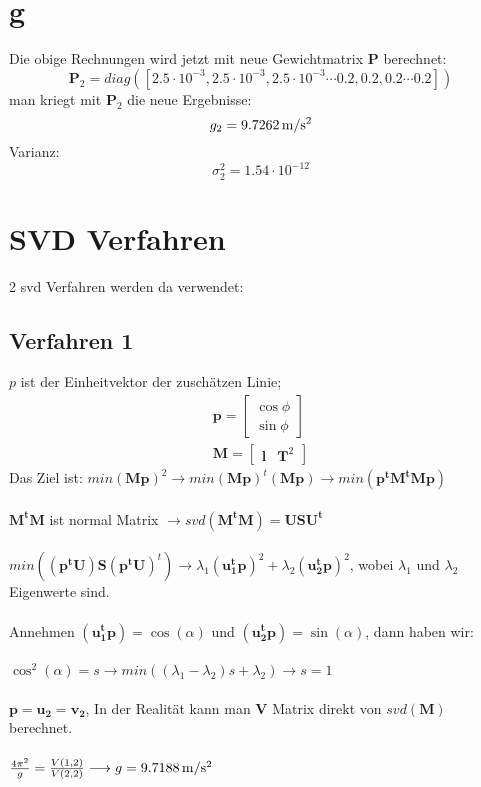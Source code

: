 \section{g}
Die obige Rechnungen wird jetzt mit neue Gewichtmatrix $\bm{P}$ berechnet:
\begin{equation*}
	\bm{P}_2 = diag([2.5\cdot10^{-3},2.5\cdot10^{-3},2.5\cdot10^{-3} \cdots 0.2, 0.2, 0.2\cdots 0.2])
\end{equation*}
man kriegt mit $\bm{P}_2$ die neue Ergebnisse:
\begin{equation*}
	g_2 = 9.7262 \,\mathrm{m/s^2}
\end{equation*}
Varianz:
\begin{equation*}
	\sigma^2_2 = 1.54 \cdot 10^{-12}
\end{equation*}
\section{SVD Verfahren}
2 svd Verfahren werden da verwendet:
\subsection{Verfahren 1}
$p$ ist der Einheitvektor der zuschätzen Linie;
\begin{gather}
	\bm{p} = \begin{bmatrix}
		\cos \phi \\
		\sin \phi
	\end{bmatrix}\\
	\bm{M} = \begin{bmatrix}
	\bm{l} &	\bm{T}^2 
	\end{bmatrix}
\end{gather}
Das Ziel ist: $min (\bm{Mp})^2 \rightarrow min(\bm{Mp})^t(\bm{Mp}) \rightarrow min(\bm{p^tM^tMp})$
\\\\
$\bm{M^tM}$ ist normal Matrix $\rightarrow svd(\bm{M^tM}) = \bm{U S U^t}$
\\\\
$min((\bm{p^tU}) \bm{S} (\bm{p^tU})^t) \rightarrow \lambda_1 (\bm{u_1^t p})^2 + \lambda_2 (\bm{u_2^t p})^2$, wobei $\lambda_1$ und $\lambda_2$ Eigenwerte sind. 
\\\\
Annehmen
$(\bm{u_1^t p}) = \cos(\alpha)$ und $(\bm{u_2^t p}) = \sin(\alpha)$, dann haben wir:
\\\\
$\cos^2(\alpha) = s \rightarrow min((\lambda_1 - \lambda_2)s + \lambda_2) \rightarrow s = 1$
\\\\
$\bm{p} = \bm{u_2} = \bm{v_2}$, In der Realität kann man $\bm{V}$ Matrix direkt von $svd(\bm{M})$ berechnet.\\\\ $\frac{4 \pi^2}{g} = \frac{V(1,2)}{V(2,2)} \longrightarrow g = 9.7188 \,\mathrm{m/s^2}$

